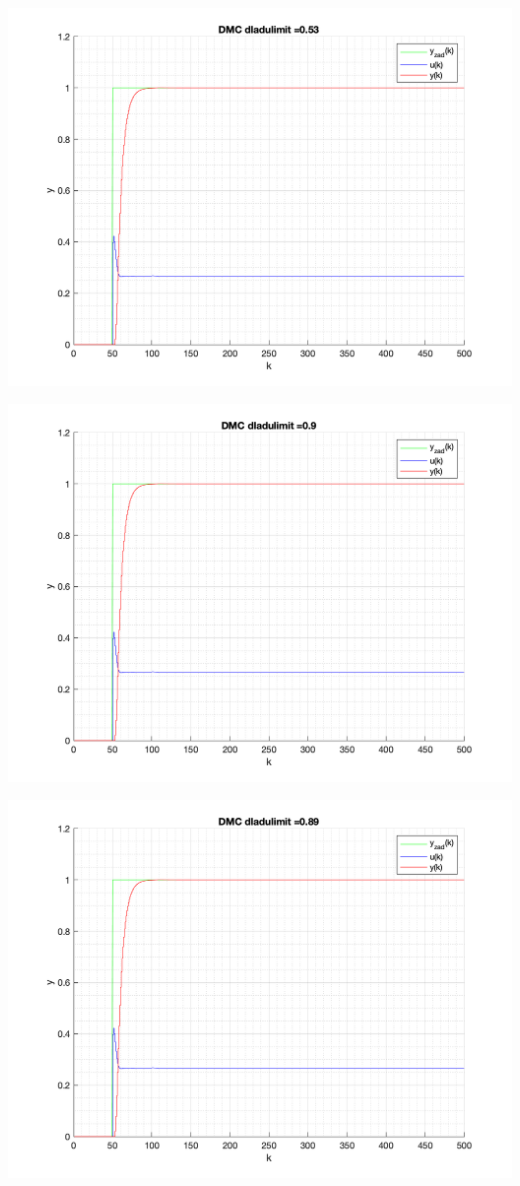 \documentclass[a4paper, 11pt]{article}
\begin{document}
\begin{enumerate}
 \includegraphics[width=\linewidth]{./ModelsP6_dulimit/P4_DMC_dulimit_0_53_png.png} 
 
 \includegraphics[width=\linewidth]{./ModelsP6_dulimit/P4_DMC_dulimit_0_9_png.png} 
 
 \includegraphics[width=\linewidth]{./ModelsP6_dulimit/P4_DMC_dulimit_0_89_png.png} 
 

\end{enumerate}
\end{document}
